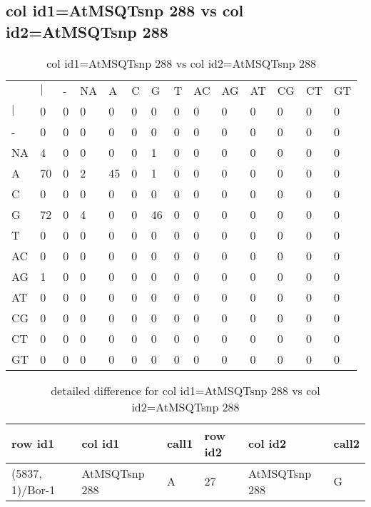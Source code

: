 \subsection{col id1=AtMSQTsnp 288 vs col id2=AtMSQTsnp 288}
\begin{center}
\begin{longtable}{|l|l|l|l|l|l|l|l|l|l|l|l|l|l|}
\caption{col id1=AtMSQTsnp 288 vs col id2=AtMSQTsnp 288} \label{table_dm636}\\
\hline
\\
\hline
&$|$&-&NA&A&C&G&T&AC&AG&AT&CG&CT&GT\\
$|$&0&0&0&0&0&0&0&0&0&0&0&0&0\\
-&0&0&0&0&0&0&0&0&0&0&0&0&0\\
NA&4&0&0&0&0&1&0&0&0&0&0&0&0\\
A&70&0&2&45&0&1&0&0&0&0&0&0&0\\
C&0&0&0&0&0&0&0&0&0&0&0&0&0\\
G&72&0&4&0&0&46&0&0&0&0&0&0&0\\
T&0&0&0&0&0&0&0&0&0&0&0&0&0\\
AC&0&0&0&0&0&0&0&0&0&0&0&0&0\\
AG&1&0&0&0&0&0&0&0&0&0&0&0&0\\
AT&0&0&0&0&0&0&0&0&0&0&0&0&0\\
CG&0&0&0&0&0&0&0&0&0&0&0&0&0\\
CT&0&0&0&0&0&0&0&0&0&0&0&0&0\\
GT&0&0&0&0&0&0&0&0&0&0&0&0&0\\
\hline
\end{longtable}
\end{center}

\begin{center}
\begin{longtable}{|l|l|l|l|l|l|}
\caption{detailed difference for col id1=AtMSQTsnp 288 vs col id2=AtMSQTsnp 288} \label{table_dm637}\\
\hline
row id1&col id1&call1&row id2&col id2&call2\\
\hline
(5837, 1)/Bor-1&AtMSQTsnp 288&A&27&AtMSQTsnp 288&G\\
\hline
\end{longtable}
\end{center}

